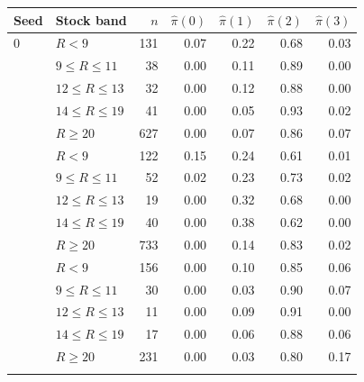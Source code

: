 \begin{tabular}{llrrrrr}
\toprule
Seed & Stock band & $n$ & $\hat\pi(0)$ & $\hat\pi(1)$ & $\hat\pi(2)$ & $\hat\pi(3)$ \\
\midrule
0 & $R<9$ & 131 & 0.07 & 0.22 & 0.68 & 0.03 \\
 & $9\le R\le 11$ & 38 & 0.00 & 0.11 & 0.89 & 0.00 \\
 & $12\le R\le 13$ & 32 & 0.00 & 0.12 & 0.88 & 0.00 \\
 & $14\le R\le 19$ & 41 & 0.00 & 0.05 & 0.93 & 0.02 \\
 & $R\ge 20$ & 627 & 0.00 & 0.07 & 0.86 & 0.07 \\
\addlinespace
1 & $R<9$ & 122 & 0.15 & 0.24 & 0.61 & 0.01 \\
 & $9\le R\le 11$ & 52 & 0.02 & 0.23 & 0.73 & 0.02 \\
 & $12\le R\le 13$ & 19 & 0.00 & 0.32 & 0.68 & 0.00 \\
 & $14\le R\le 19$ & 40 & 0.00 & 0.38 & 0.62 & 0.00 \\
 & $R\ge 20$ & 733 & 0.00 & 0.14 & 0.83 & 0.02 \\
\addlinespace
2 & $R<9$ & 156 & 0.00 & 0.10 & 0.85 & 0.06 \\
 & $9\le R\le 11$ & 30 & 0.00 & 0.03 & 0.90 & 0.07 \\
 & $12\le R\le 13$ & 11 & 0.00 & 0.09 & 0.91 & 0.00 \\
 & $14\le R\le 19$ & 17 & 0.00 & 0.06 & 0.88 & 0.06 \\
 & $R\ge 20$ & 231 & 0.00 & 0.03 & 0.80 & 0.17 \\
\addlinespace
\bottomrule
\end{tabular}
